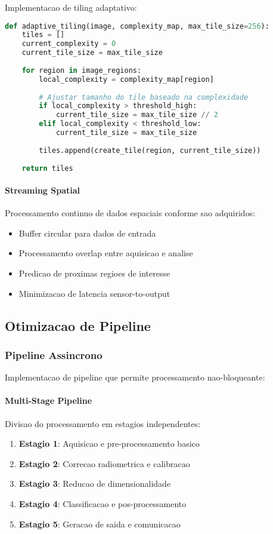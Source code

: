 Implementacao de tiling adaptativo:
\begin{lstlisting}[language=Python]
def adaptive_tiling(image, complexity_map, max_tile_size=256):
    tiles = []
    current_complexity = 0
    current_tile_size = max_tile_size
    
    for region in image_regions:
        local_complexity = complexity_map[region]
        
        # Ajustar tamanho do tile baseado na complexidade
        if local_complexity > threshold_high:
            current_tile_size = max_tile_size // 2
        elif local_complexity < threshold_low:
            current_tile_size = max_tile_size
        
        tiles.append(create_tile(region, current_tile_size))
    
    return tiles
\end{lstlisting}

\paragraph{Streaming Spatial}
Processamento continuo de dados espaciais conforme sao adquiridos:
\begin{itemize}
    \item Buffer circular para dados de entrada
    \item Processamento overlap entre aquisicao e analise
    \item Predicao de proximas regioes de interesse
    \item Minimizacao de latencia sensor-to-output
\end{itemize}

\subsection{Otimizacao de Pipeline}

\subsubsection{Pipeline Assincrono}
Implementacao de pipeline que permite processamento nao-bloqueante:

\paragraph{Multi-Stage Pipeline}
Divisao do processamento em estagios independentes:
\begin{enumerate}
    \item \textbf{Estagio 1}: Aquisicao e pre-processamento basico
    \item \textbf{Estagio 2}: Correcao radiometrica e calibracao
    \item \textbf{Estagio 3}: Reducao de dimensionalidade
    \item \textbf{Estagio 4}: Classificacao e pos-processamento
    \item \textbf{Estagio 5}: Geracao de saida e comunicacao
\end{enumerate}

